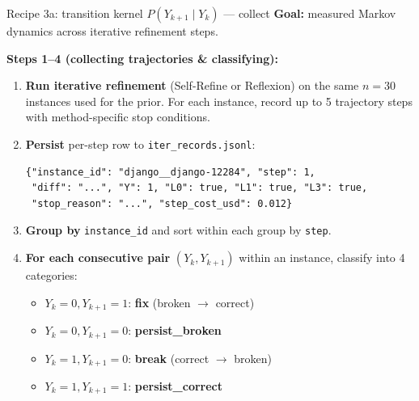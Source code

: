 \documentclass[10pt]{beamer}
\newcommand{\good}[1]{\textcolor{accentGreen}{\textbf{#1}}}
\newcommand{\bad}[1]{\textcolor{accentRed}{\textbf{#1}}}
\newcommand{\warn}[1]{\textcolor{accentOrange}{\textbf{#1}}}
\newcommand{\info}[1]{\textcolor{primaryBlue}{\textbf{#1}}}
\begin{document}
\begin{frame}[fragile]{Recipe 3a: transition kernel \textcolor{accentRed}{$P(Y_{k+1}\mid Y_k)$} --- collect}
\vspace{0.15cm}
\textbf{Goal:} measured Markov dynamics across iterative refinement steps.

\vspace{0.2cm}
\textbf{Steps 1--4 (collecting trajectories \& classifying):}
\begin{enumerate}
\item \info{Run iterative refinement} (Self-Refine or Reflexion) on the same
  $n=30$ instances used for the prior. For each instance, record up to 5
  trajectory steps with method-specific stop conditions.

\item \info{Persist} per-step row to \texttt{iter\_records.jsonl}:
  \begin{lstlisting}[basicstyle=\ttfamily\tiny]
{"instance_id": "django__django-12284", "step": 1,
 "diff": "...", "Y": 1, "L0": true, "L1": true, "L3": true,
 "stop_reason": "...", "step_cost_usd": 0.012}
  \end{lstlisting}

\item \info{Group by} \texttt{instance\_id} and sort within each group by
  \texttt{step}.

\item \info{For each consecutive pair} $(Y_k, Y_{k+1})$ within an instance,
  classify into 4 categories:
  \begin{itemize}
  \item $Y_k{=}0, Y_{k+1}{=}1$: \good{fix} (broken $\to$ correct)
  \item $Y_k{=}0, Y_{k+1}{=}0$: \warn{persist\_broken}
  \item $Y_k{=}1, Y_{k+1}{=}0$: \bad{break} (correct $\to$ broken)
  \item $Y_k{=}1, Y_{k+1}{=}1$: \good{persist\_correct}
  \end{itemize}
\end{enumerate}
\end{frame}
\end{document}
